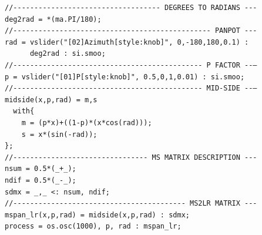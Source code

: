 
\begin{lstlisting}
//----------------------------------- DEGREES TO RADIANS ---
deg2rad = *(ma.PI/180);
//----------------------------------------------- PANPOT ---
rad = vslider("[02]Azimuth[style:knob]", 0,-180,180,0.1) :
      deg2rad : si.smoo;
//--------------------------------------------- P FACTOR --–
p = vslider("[01]P[style:knob]", 0.5,0,1,0.01) : si.smoo;
//--------------------------------------------- MID-SIDE --–
midside(x,p,rad) = m,s
  with{
    m = (p*x)+((1-p)*(x*cos(rad)));
    s = x*(sin(-rad));
};
//-------------------------------- MS MATRIX DESCRIPTION ---
nsum = 0.5*(_+_);
ndif = 0.5*(_-_);
sdmx = _,_ <: nsum, ndif;
//----------------------------------------- MS2LR MATRIX ---
mspan_lr(x,p,rad) = midside(x,p,rad) : sdmx;
process = os.osc(1000), p, rad : mspan_lr;
\end{lstlisting}
